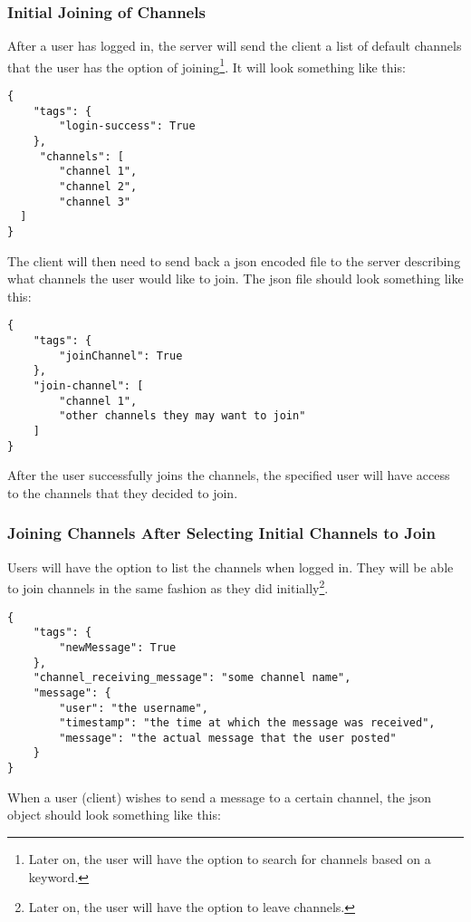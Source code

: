 \subsubsection{Initial Joining of Channels}
After a user has logged in, the server will send the client a list of default channels that the user has the option of joining\footnote{Later on, the user will have the option to search for channels based on a keyword.}. It will look something like this:

\begin{lstlisting}[style=json]
{
    "tags": {
        "login-success": True
    },
     "channels": [
        "channel 1",
        "channel 2",
        "channel 3"
  ]
}
\end{lstlisting}

The client will then need to send back a \gls{json} encoded file to the server describing what channels the user would like to join. The \gls{json} file should look something like this:

\begin{lstlisting}[style=json]
{
    "tags": {
        "joinChannel": True
    },
    "join-channel": [
        "channel 1",
        "other channels they may want to join"
    ]
}
\end{lstlisting}

After the user successfully joins the channels, the specified user will have
access to the channels that they decided to join.

\subsubsection{Joining Channels After Selecting Initial Channels to Join}
Users will have the option to list the channels when logged in. They will be able to join channels in the same fashion as they did initially\footnote{Later on, the user will have the option to leave channels.}.

\begin{lstlisting}[style=json]
{
    "tags": {
        "newMessage": True
    },
    "channel_receiving_message": "some channel name",
    "message": {
        "user": "the username",
        "timestamp": "the time at which the message was received",
        "message": "the actual message that the user posted"
    }
}
\end{lstlisting}

When a user (client) wishes to send a message to a certain channel, the \gls{json} object should look something like this:

